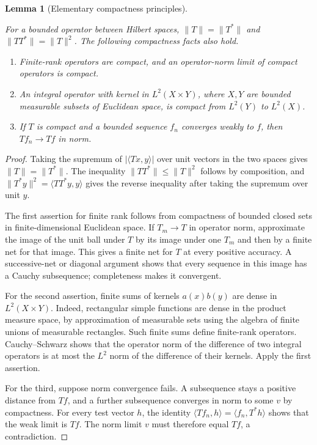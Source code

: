 \documentclass[11pt]{amsart}
\newtheorem{lemma}[theorem]{Lemma}
\theoremstyle{definition}
\theoremstyle{remark}
\numberwithin{equation}{section}
\providecommand{\lean}[1]{}
\providecommand{\leanok}{}
\begin{document}
\begin{lemma}[Elementary compactness principles]\label{ext:compact-facts}
\lean{Auto.ext_compact_facts_norm_adjoint,Auto.ext_compact_facts_norm_comp_adjoint,Auto.ext_compact_facts_finite_rank,Auto.ext_compact_facts_limit,Auto.ext_compact_facts_integral,Auto.ext_compact_facts_weak}
\leanok
For a bounded operator between Hilbert spaces,
$\|T\|=\|T^*\|$ and $\|TT^*\|=\|T\|^2$.
The following compactness facts also hold.
\begin{enumerate}
\item Finite-rank operators are compact, and an operator-norm
limit of compact operators is compact.
\item An integral operator with kernel in $L^2(X\times Y)$,
where $X,Y$ are bounded measurable subsets of Euclidean space,
is compact from $L^2(Y)$ to $L^2(X)$.
\item If $T$ is compact and a bounded sequence $f_n$ converges
weakly to $f$, then $Tf_n\to Tf$ in norm.
\end{enumerate}
\end{lemma}
\begin{proof}
Taking the supremum of $|\langle Tx,y\rangle|$ over unit
vectors in the two spaces gives $\|T\|=\|T^*\|$.
The inequality $\|TT^*\|\le\|T\|^2$ follows by composition,
and $\|T^*y\|^2=\langle TT^*y,y\rangle$ gives the reverse
inequality after taking the supremum over unit $y$.

The first assertion for finite rank follows from compactness of
bounded closed sets in finite-dimensional Euclidean space.
If $T_m\to T$ in operator norm, approximate the image of the
unit ball under $T$ by its image under one $T_m$ and then by a
finite net for that image.  This gives a finite net for $T$ at
every positive accuracy.  A successive-net or diagonal argument
shows that every sequence in this image has a Cauchy subsequence;
completeness makes it convergent.

For the second assertion, finite sums of kernels
$a(x)b(y)$ are dense in $L^2(X\times Y)$.  Indeed, rectangular
simple functions are dense in the product measure space, by
approximation of measurable sets using the algebra of finite
unions of measurable rectangles.  Such finite sums define
finite-rank operators.  Cauchy--Schwarz shows that the operator
norm of the difference of two integral operators is at most
the $L^2$ norm of the difference of their kernels.  Apply the
first assertion.

For the third, suppose norm convergence fails.  A subsequence
stays a positive distance from $Tf$, and a further subsequence
converges in norm to some $v$ by compactness.  For every test
vector $h$, the identity
$\langle Tf_n,h\rangle=\langle f_n,T^*h\rangle$ shows that the
weak limit is $Tf$.  The norm limit $v$ must therefore equal
$Tf$, a contradiction.
\end{proof}
\end{document}
